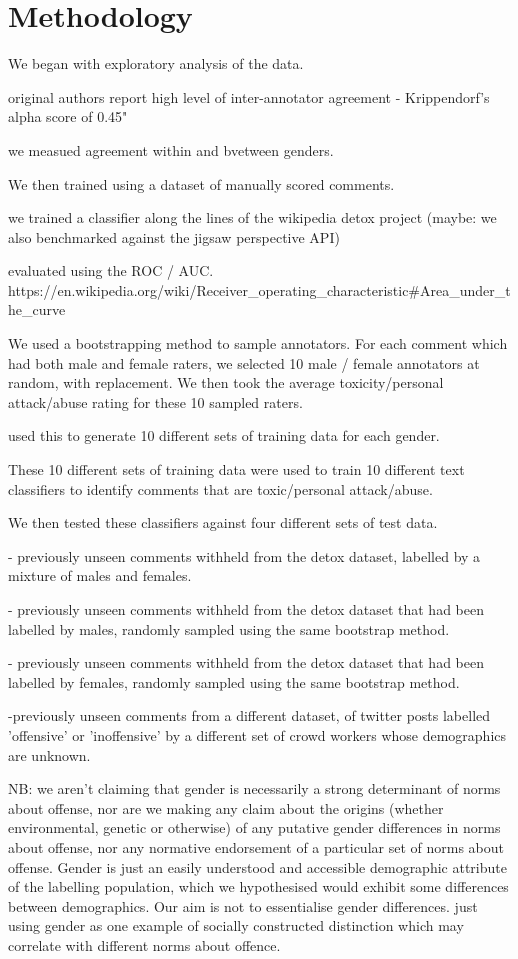 \documentclass[runningheads,a4paper]{llncs}
\begin{document}
\section{Methodology}

We began with exploratory analysis of the data.

original authors report high level of inter-annotator agreement - Krippendorf’s alpha score of 0.45"

we measued agreement within and bvetween genders.

We then trained using a dataset of manually scored comments.

we trained a classifier along the lines of the wikipedia detox project
(maybe: we also benchmarked against the jigsaw perspective API)

evaluated using the ROC / AUC.
https://en.wikipedia.org/wiki/Receiver_operating_characteristic#Area_under_the_curve

We used a bootstrapping method to sample annotators. For each comment which had both male and female raters, we selected 10 male / female annotators at random, with replacement. We then took the average toxicity/personal attack/abuse rating for these 10 sampled raters. 

used this to generate 10 different sets of training data for each gender.

These 10 different sets of training data were used to train 10 different text classifiers to identify comments that are toxic/personal attack/abuse.

We then tested these classifiers against four different sets of test data.

- previously unseen comments withheld from the detox dataset, labelled by a mixture of males and females.

- previously unseen comments withheld from the detox dataset that had been labelled by males, randomly sampled using the same bootstrap method.

- previously unseen comments withheld from the detox dataset that had been labelled by females, randomly sampled using the same bootstrap method.

-previously unseen comments from a different dataset, of twitter posts labelled 'offensive' or 'inoffensive' by a different set of crowd workers whose demographics are unknown.


NB: we aren't claiming that gender is necessarily a strong determinant of norms about offense, nor are we making any claim about the origins (whether environmental, genetic or otherwise) of any putative gender differences in norms about offense, nor any normative endorsement of a particular set of norms about offense. Gender is just an easily understood and accessible demographic attribute of the labelling population, which we hypothesised would exhibit some differences between demographics. Our aim is not to essentialise gender differences. just using gender as one example of socially constructed distinction which may correlate with different norms about offence.
\end{document}
